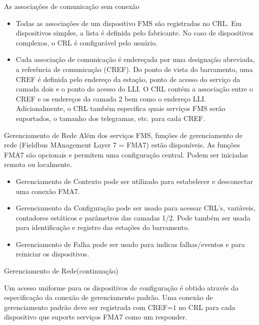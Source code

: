 \documentclass{beamer}
\begin{document}
\begin{frame}{As associações de comunicação sem conexão}
\begin{itemize}
\item
Todas as associações de um dispositivo FMS são registradas no CRL. Em dispositivos simples, a lista é definida pelo fabricante. No caso de dispositivos complexos, o CRL é configurável pelo usuário. 

\item
Cada associação de comunicação é endereçada por uma designação abreviada, a referência de comunicação (CREF). Do ponto de vista do barramento, uma CREF é definida pelo endereço da estação, ponto de acesso do serviço da camada dois e o ponto do acesso do LLI. O CRL contém a associação entre o CREF e os endereços da camada 2 bem como o endereço LLI. Adicionalmente, o CRL também especifica quais serviços FMS serão suportados, o tamanho dos telegramas, etc. para cada CREF.
\end{itemize}
\end{frame}

\begin{frame}{Gerenciamento de Rede}
Além dos serviços FMS, funções de gerenciamento de rede (Fieldbus MAnagement Layer 7 = FMA7) estão disponíveis. As funções FMA7 são opcionais e permitem uma configuração central. Podem ser iniciadas remota ou localmente.

\begin{itemize}
\item Gerenciamento de Contexto pode ser utilizado para estabelecer e desconectar uma conexão FMA7. 

\item Gerenciamento da Configuração pode ser usado para acessar CRL’s, variáveis, contadores estáticos e parâmetros das camadas 1/2. Pode também ser usada para identificação e registro das estações do barramento. 

\item Gerenciamento de Falha pode ser usado para indicas falhas/eventos e para reiniciar os dispositivos. 
\end{itemize}

\end{frame}

\begin{frame}{Gerenciamento de Rede(continuação)}

Um acesso uniforme para os dispositivos de configuração é obtido através da especificação da conexão de gerenciamento padrão. Uma conexão de gerenciamento padrão deve ser registrada com CREF=1 no CRL para cada dispositivo que suporte serviços FMA7 como um responder.

\end{frame}
\end{document}
